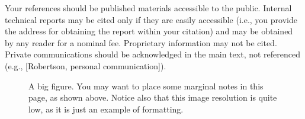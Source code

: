 \documentclass{chi-ext}
\begin{document}
Your references should be published materials accessible to the public.  
Internal technical reports may be cited only if they are easily accessible (i.e., you provide the address for obtaining the report within your citation) and may be obtained by any reader for a nominal fee.  
Proprietary information may not be cited. 
Private communications should be acknowledged in the main text, not referenced  (e.g., [Robertson, personal communication]).



\clearpage
{}
\begin{figure}
\hspace*{-0.5\textwidth}%
\parbox{\textwidth}{
  \begin{center}
  \caption{A big figure. You may want to place some marginal notes in this page, as shown above. Notice also that this image resolution is quite low, as it is just an example of formatting.}
  \label{fig:bigsample}
  \end{center}  
}
\end{figure}



\end{document}
